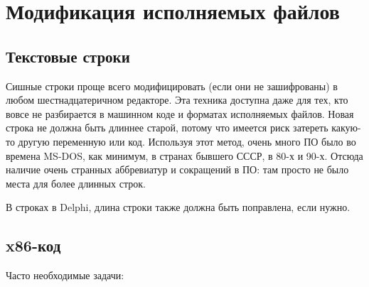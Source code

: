 \section{Модификация исполняемых файлов}

\subsection{Текстовые строки}

Сишные строки проще всего модифицировать (если они не зашифрованы) в любом шестнадцатеричном редакторе.
Эта техника доступна даже для тех, кто вовсе не разбирается в машинном коде и форматах исполняемых
файлов.
Новая строка не должна быть длиннее старой, потому что имеется риск затереть какую-то другую переменную
или код.
Используя этот метод, очень много ПО было  во времена MS-DOS, как минимум,
в странах бывшего СССР, в 80-х и 90-х.
Отсюда наличие очень странных аббревиатур и сокращений в  ПО: 
там просто не было места для более
длинных строк.

В строках в Delphi, длина строки также должна быть поправлена, если нужно.

\subsection{x86-код}
\label{x86_patching}

Часто необходимые задачи:


